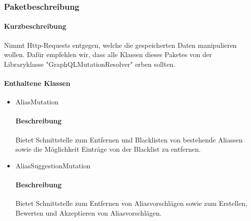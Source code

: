 \subsubsection*{Paketbeschreibung}%
\paragraph*{Kurzbeschreibung}
Nimmt Http-Requests entgegen, welche die gespeicherten Daten manipulieren wollen.
Dafür empfehlen wir, dass alle Klassen dieses Paketes von der Libraryklasse "GraphQLMutationResolver" erben sollten.
\paragraph*{Enthaltene Klassen}
\begin{itemize}
    \item AliasMutation
    		\paragraph*{Beschreibung}
            Bietet Schnittstelle zum Entfernen und Blacklisten von bestehende Aliassen sowie die Möglichkeit Einträge von der Blacklist zu entfernen.
    \item AliasSuggestionMutation
    		\paragraph*{Beschreibung}
    		Bietet Schnittstelle zum Entfernen von Aliasvorschlägen sowie zum Erstellen, Bewerten und Akzeptieren von Aliasvorschlägen.
\end{itemize}